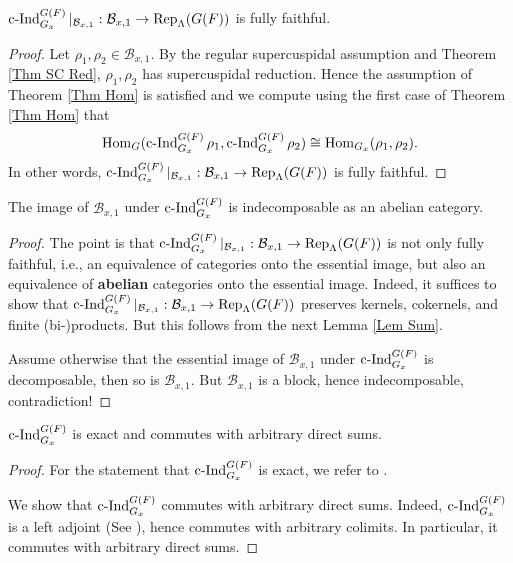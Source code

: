 		\begin{lemma}\label{Lem Thm Hom implies fully faithful}
			$\operatorname{\operatorname{c-Ind}}_{G_x}^{G(F)}|_{\mathcal{B}_{x,1}}: \mathcal{B}_{x,1} \to \operatorname{\operatorname{Rep}}_{\Lambda}(G(F))$ is fully faithful.
		\end{lemma}
		
		\begin{proof}
			Let $\rho_1, \rho_2 \in \mathcal{B}_{x,1}$. By the regular supercuspidal assumption and Theorem \ref{Thm SC Red}, $\rho_1, \rho_2$ has supercuspidal reduction. Hence the assumption of Theorem \ref{Thm Hom} is satisfied and we compute using the first case of Theorem \ref{Thm Hom} that
			$$\operatorname{\operatorname{Hom}}_G(\operatorname{\operatorname{c-Ind}}_{G_x}^{G(F)}\rho_1, \operatorname{\operatorname{c-Ind}}_{G_x}^{G(F)}\rho_2) \cong \operatorname{\operatorname{Hom}}_{G_x}(\rho_1, \rho_2).$$
			In other words, $\operatorname{\operatorname{c-Ind}}_{G_x}^{G(F)}|_{\mathcal{B}_{x,1}}: \mathcal{B}_{x,1} \to \operatorname{\operatorname{Rep}}_{\Lambda}(G(F))$ is fully faithful.
		\end{proof}
		
		\begin{lemma}\label{Lem Indec}
			The image of $\mathcal{B}_{x,1}$ under $\operatorname{\operatorname{c-Ind}}_{G_x}^{G(F)}$ is indecomposable as an abelian category.
		\end{lemma}
		
		\begin{proof}
			The point is that $\operatorname{\operatorname{c-Ind}}_{G_x}^{G(F)}|_{\mathcal{B}_{x,1}}: \mathcal{B}_{x,1} \to \operatorname{\operatorname{Rep}}_{\Lambda}(G(F))$ is not only fully faithful, i.e., an equivalence of categories onto the essential image, but also an equivalence of \textbf{abelian} categories onto the essential image. Indeed, it suffices to show that $\operatorname{\operatorname{c-Ind}}_{G_x}^{G(F)}|_{\mathcal{B}_{x,1}}: \mathcal{B}_{x,1} \to \operatorname{\operatorname{Rep}}_{\Lambda}(G(F))$ preserves kernels, cokernels, and finite (bi-)products. But this follows from the next Lemma \ref{Lem Sum}.
			
			Assume otherwise that the essential image of $\mathcal{B}_{x,1}$ under $\operatorname{\operatorname{c-Ind}}_{G_x}^{G(F)}$ is decomposable, then so is $\mathcal{B}_{x,1}$. But $\mathcal{B}_{x,1}$ is a block, hence indecomposable, contradiction!
		\end{proof}
		
		\begin{lemma}\label{Lem Sum}
			$\operatorname{\operatorname{c-Ind}}_{G_x}^{G(F)}$ is exact and commutes with arbitrary direct sums.
		\end{lemma}
		
		\begin{proof}
			For the statement that $\operatorname{\operatorname{c-Ind}}_{G_x}^{G(F)}$ is exact, we refer to \cite[I.5.10]{vigneras1996representations}.
			
			We show that $\operatorname{\operatorname{c-Ind}}_{G_x}^{G(F)}$ commutes with arbitrary direct sums. Indeed, $\operatorname{\operatorname{c-Ind}}_{G_x}^{G(F)}$ is a left adjoint (See \cite[I.5.7]{vigneras1996representations}), hence commutes with arbitrary colimits. In particular, it commutes with arbitrary direct sums.
		\end{proof}
		
